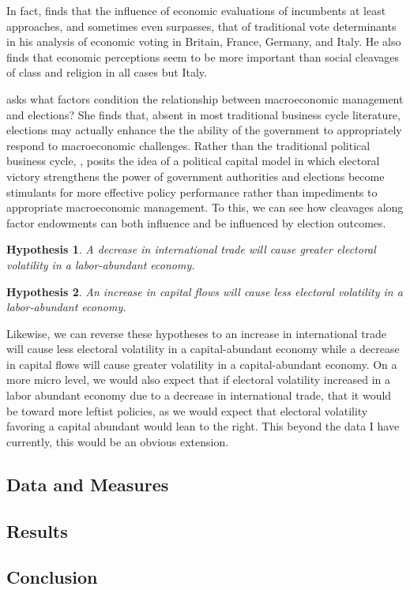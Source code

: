 \documentclass[12pt,letterpaper]{article}
\newtheorem{hyp}{Hypothesis}
\begin{document}
In fact, \citet{Lewis-Beck1986} finds that the influence of economic evaluations of incumbents at least approaches, and sometimes even surpasses, that of traditional vote determinants in his analysis of economic voting in Britain, France, Germany, and Italy. He also finds that economic perceptions seem to be more important than social cleavages of class and religion in all cases but Italy. 

\citet{Remmer1993} asks what factors condition the relationship between macroeconomic management and elections? She finds that, absent in most traditional business cycle literature, elections may actually enhance the the ability of the government to appropriately respond to macroeconomic challenges. Rather than the traditional political business cycle, \citet{Remmer1993}, posits the idea of a political capital model in which electoral victory strengthens the power of government authorities and elections become stimulants for more effective policy performance rather than impediments to appropriate macroeconomic management. To this, we can see how cleavages along factor endowments can both influence and be influenced by election outcomes. 

\begin{hyp}
A decrease in international trade will cause greater electoral volatility in a labor-abundant economy.
\end{hyp}

\begin{hyp}
An increase in capital flows will cause less electoral volatility in a labor-abundant economy.
\end{hyp}

Likewise, we can reverse these hypotheses to an increase in international trade will cause less electoral volatility in a capital-abundant economy while a decrease in capital flows will cause greater volatility in a capital-abundant economy. On a more micro level, we would also expect that if electoral volatility increased in a labor abundant economy due to a decrease in international trade, that it would be toward more leftist policies, as we would expect that electoral volatility favoring a capital abundant would lean to the right. This beyond the data I have currently, this would be an obvious extension. 
\subsection*{Data and Measures}

\subsection*{Results}

\subsection*{Conclusion}

\newpage


\end{document}
